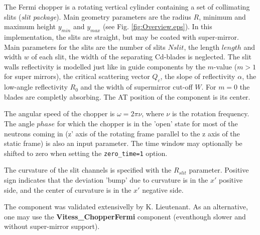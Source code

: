 The Fermi chopper is a rotating vertical cylinder containing a set of collimating slits (\emph{slit package}). Main geometry parameters are the radius $R$, minimum and maximum height $y_{min}$ and $y_{max}$ (see Fig. \ref{fig:Overview.eps}).
In this implementation, the slits are straight, but may be coated with super-mirror. Main parameters for the slits are the number of slits $Nslit$, the length $length$ and width $w$ of each slit, the width of the separating Cd-blades is neglected. The slit walls reflectivity is modelled just like in guide components by the $m$-value ($m > 1$ for super mirrors), the critical scattering vector $Q_c$, the slope of reflectivity $\alpha$, the low-angle reflectivity $R_0$ and the width of supermirror cut-off $W$. For $m=0$ the blades are completly absorbing. The AT position of the component is its center.

The angular speed of the chopper is $\omega = 2\pi \nu$, where $\nu$ is the rotation frequency. The angle $phase$ for which the chopper is in the 'open' state for most of the neutrons coming in (z' axis of the rotating frame parallel to the z axis of the static frame) is also an input parameter. The time window may optionally be shifted to zero when setting the \verb+zero_time=1+ option.

The curvature of the slit channels is specified with the $R_{slit}$ parameter. Positive sign indicates that the deviation 'bump' due to curvature is in the $x'$ positive side, and the center of curvature is in the $x'$ negative side.

The component was validated extensivelly by K. Lieutenant. As an alternative, one may use the {\bf Vitess\_ChopperFermi} component (eventhough slower and without super-mirror support).

